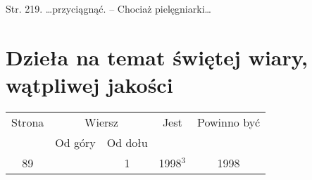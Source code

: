 \documentclass[a4paper,11pt]{article}
\begin{document}


Str. 219. \ldots przyciągnąć. -- Chociaż pielęgniarki\ldots


\vspace{\spaceTwo}










\newpage

\section{Dzieła na temat świętej wiary, wątpliwej jakości}

\vspace{\spaceTwo}

















\vspace{\spaceFive}


\begin{center}

  \begin{tabular}{|c|c|c|c|c|}
    \hline
    Strona & \multicolumn{2}{c|}{Wiersz} & Jest
                              & Powinno być \\ \cline{2-3}
    & Od góry & Od dołu & & \\
    \hline
    89 & &  1 & 1998$^{ 3 }$ & 1998 \\
    \hline
  \end{tabular}

\end{center}
\end{document}
